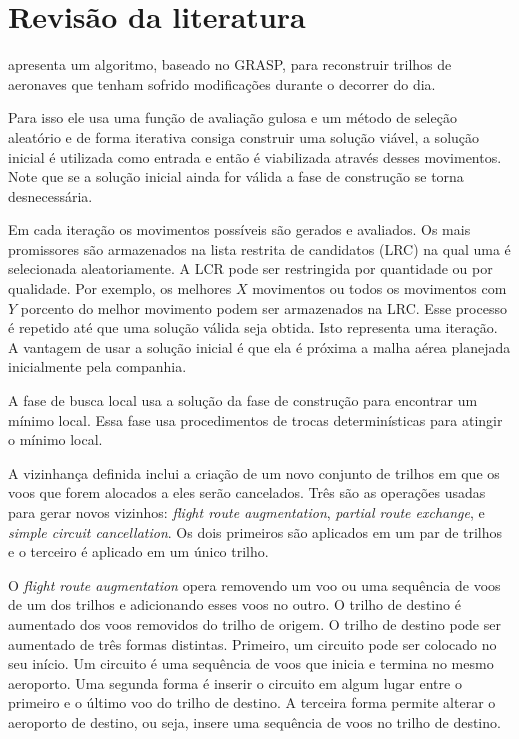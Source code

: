 \chapter{Revisão da literatura}
  
\cite{arguelo1997} apresenta um algoritmo, baseado no GRASP, para reconstruir
trilhos de aeronaves que tenham sofrido modificações durante o decorrer do dia.

Para isso ele usa uma função de avaliação gulosa e um método de seleção
aleatório e de forma iterativa consiga construir uma solução viável, a solução
inicial é utilizada como entrada e então é viabilizada através desses
movimentos. Note que se a solução inicial ainda for válida a fase de construção
se torna desnecessária. 

Em cada iteração os movimentos possíveis são gerados e
avaliados. Os mais promissores são armazenados na lista restrita de candidatos
(LRC) na qual uma é selecionada aleatoriamente. A LCR pode ser restringida por
quantidade ou por qualidade. Por exemplo, os melhores $X$ movimentos ou todos os
movimentos com $Y$ porcento do melhor movimento podem ser armazenados na LRC.
Esse processo é repetido até que uma solução válida seja obtida. Isto
representa uma iteração. A vantagem de usar a solução inicial é que ela é
próxima a malha aérea planejada inicialmente pela companhia. 

A fase de busca local usa a solução da fase de construção para encontrar um
mínimo local. Essa fase usa procedimentos de trocas determinísticas para
atingir o mínimo local. 

A vizinhança definida inclui a criação de um novo  conjunto de trilhos em que os
voos que forem alocados a eles serão cancelados. Três são as operações usadas
para gerar novos vizinhos: \textit{flight route augmentation}, \textit{partial
route exchange}, e \textit{simple circuit cancellation}. Os dois primeiros são
aplicados em um par de trilhos e o terceiro é aplicado em um único trilho. 

O \textit{flight route augmentation} opera removendo um voo ou uma sequência de
voos de um dos trilhos e adicionando esses voos no outro. O trilho de destino é
aumentado dos voos removidos do trilho de origem. O trilho de destino pode ser
aumentado de três formas distintas. Primeiro, um circuito pode ser colocado no
seu início. Um circuito é uma sequência de voos que inicia e termina no mesmo
aeroporto. Uma segunda forma é inserir o circuito em algum lugar entre o
primeiro e o último voo do trilho de destino. A terceira forma permite alterar
o aeroporto de destino, ou seja, insere uma sequência de voos no trilho de destino. 

